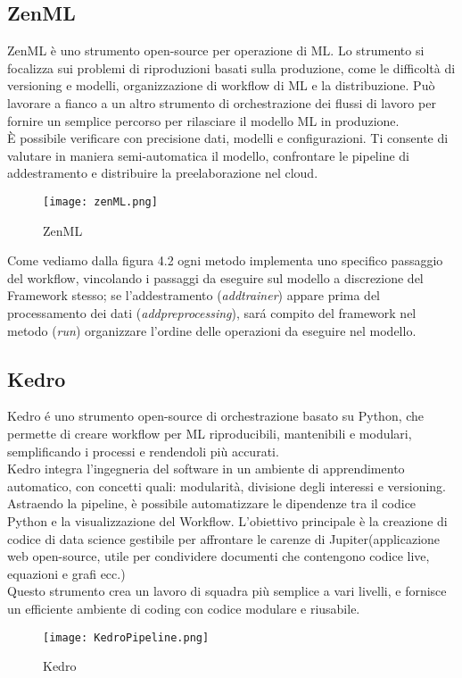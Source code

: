 \documentclass[../tesi.tex]{subfiles}
\begin{document}
  \subsection{ZenML} 
  ZenML è uno strumento open-source per operazione di ML.
  Lo strumento si focalizza sui problemi di riproduzioni basati sulla produzione, come le difficoltà di versioning e modelli, organizzazione di workflow di ML e la distribuzione. Può lavorare a fianco a un altro strumento di orchestrazione dei flussi di lavoro per fornire un semplice percorso per rilasciare il modello ML in produzione.\\
  È possibile verificare con precisione dati, modelli e configurazioni. Ti consente di valutare in maniera semi-automatica il modello, confrontare le pipeline di addestramento e distribuire la preelaborazione nel cloud.
  
  \begin{figure}[htbp]
    \centering
    \texttt{[image: zenML.png]} 
    \caption{ZenML}
    \end{figure}
  Come vediamo dalla figura 4.2 ogni metodo implementa uno specifico passaggio del workflow, vincolando i passaggi da eseguire sul modello a discrezione del Framework stesso; se l'addestramento (\textit{add\textunderscore trainer}) appare prima del processamento dei dati (\textit{add\textunderscore preprocessing}), sará compito del framework nel metodo (\textit{run}) organizzare l'ordine delle operazioni da eseguire nel modello.
  
  \subsection{Kedro}
Kedro é uno strumento open-source di orchestrazione basato su Python, che permette di creare workflow per ML riproducibili, mantenibili e modulari, semplificando i processi e rendendoli più accurati.\\
Kedro integra l’ingegneria del software in un ambiente di apprendimento automatico, con concetti quali: modularità, divisione degli interessi e versioning.\\
Astraendo la pipeline, è possibile automatizzare le dipendenze tra il codice Python e la visualizzazione del Workflow. L’obiettivo principale è la creazione di codice di data science gestibile per affrontare le carenze di Jupiter(applicazione web open-source, utile per condividere documenti che contengono codice live, equazioni e grafi ecc.)\\
Questo strumento crea un lavoro di squadra più semplice a vari livelli, e fornisce un efficiente ambiente di coding con codice modulare e riusabile.
\begin{figure}[htbp]
  \centering
  \texttt{[image: KedroPipeline.png]} 
  \caption{Kedro}
  \end{figure}  
\end{document}
